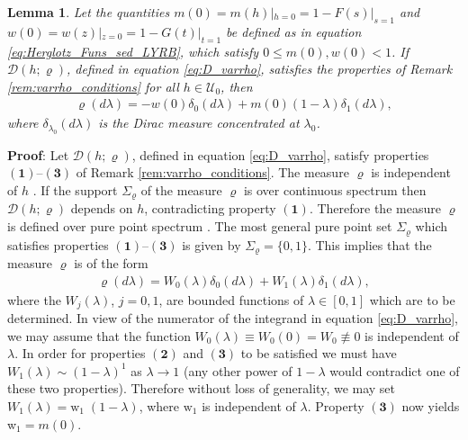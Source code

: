 \documentclass[english,12pt,jmp,graphicx]{revtex4-1}
\newtheorem{lemma}{Lemma}[section]
\begin{document}
%
%
\begin{lemma}\label{lem:Measure_consistency_condition}
  Let the quantities $m(0)=m(h)|_{h=0}=1-F(s)|_{s=1}$ and
  $w(0)=w(z)|_{z=0}=1-G(t)|_{t=1}$ be defined as in equation
  \eqref{eq:Herglotz_Funs_sed_LYRB}, which satisfy $0\leq m(0),w(0)<1$. If
  $\mathcal{D}(h;\varrho)$, defined in equation \eqref{eq:D_varrho},
  satisfies the properties of Remark \ref{rem:varrho_conditions} for
  all $h\in\mathcal{U}_0$, then     
\begin{align}\label{eq:Measure_consistency_condition_h}
 \varrho(d\lambda)=-w(0)\delta_0(d\lambda)+m(0)(1-\lambda)\delta_1(d\lambda),
\end{align}
%
where $\delta_{\lambda_0}(d\lambda)$ is the Dirac measure concentrated at $\lambda_0$. 
%
\end{lemma}
%
\noindent \textbf{Proof}:
%
Let $\mathcal{D}(h;\varrho)$, defined in equation \eqref{eq:D_varrho}, satisfy
properties $\mathbf{(1)}$--$\mathbf{(3)}$ of Remark
\ref{rem:varrho_conditions}. The measure $\varrho$ is independent of $h$
\cite{Golden:CMP-473}. If the support $\Sigma_\varrho$ of the measure $\varrho$ is over
continuous spectrum \cite{Reed-1980} then $\mathcal{D}(h;\varrho)$ depends
on $h$, contradicting property $\mathbf{(1)}$. Therefore the measure
$\varrho$ is defined over pure point spectrum
\cite{Reed-1980}. The most general pure point set $\Sigma_\varrho$ which
satisfies properties $\mathbf{(1)}$--$\mathbf{(3)}$ is given by
$\Sigma_\varrho=\{0,1\}$. This implies that the measure $\varrho$ is of the form  
% 
\begin{align*}
  \varrho(d\lambda)=W_0(\lambda)\delta_0(d\lambda)+W_1(\lambda)\delta_1(d\lambda),
\end{align*}
%
where the $W_j(\lambda)$, $j=0,1$, are bounded functions of $\lambda\in[0,1]$ which are to
be determined. In view of the numerator of the integrand in equation
\eqref{eq:D_varrho}, we may assume that the function
$W_0(\lambda)\equiv W_0(0)=W_0\not\equiv0$ is independent of $\lambda$. In order for
properties $\mathbf{(2)}$ and $\mathbf{(3)}$ to be satisfied we must
have $W_1(\lambda)\sim(1-\lambda)^1$ as $\lambda\to1$ (any other power of $1-\lambda$ would contradict
one of these two properties). Therefore without loss of generality, we
may set $W_1(\lambda)=\text{w}_1\;(1-\lambda)$, where $\text{w}_1$ is independent of
$\lambda$. Property $\mathbf{(3)}$ now yields w$_1=m(0)$. 
\end{document}
